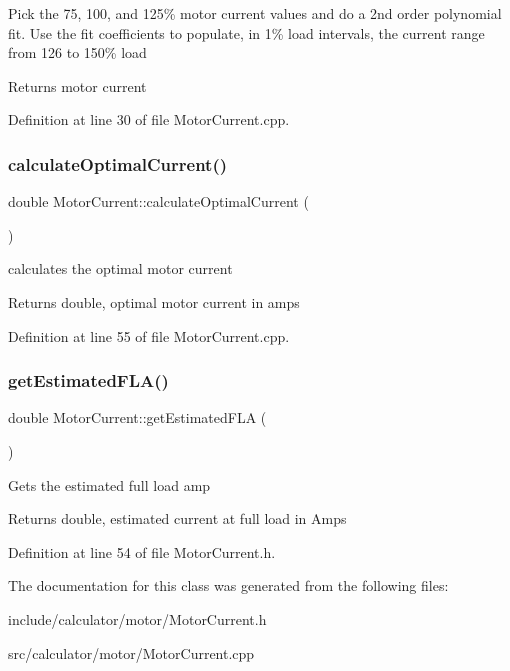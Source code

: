 Pick the 75, 100, and 125\% motor current values and do a 2nd order polynomial fit. Use the fit coefficients to populate, in 1\% load intervals, the current range from 126 to 150\% load \begin{DoxyReturn}{Returns}
motor current 
\end{DoxyReturn}


Definition at line 30 of file Motor\+Current.\+cpp.

\mbox{\label{class_motor_current_a40638a00e4d21b34c74f8406f4e70046}} 
\subsubsection{\texorpdfstring{calculate\+Optimal\+Current()}{calculateOptimalCurrent()}}
{\footnotesize\ttfamily double Motor\+Current\+::calculate\+Optimal\+Current (\begin{DoxyParamCaption}{ }\end{DoxyParamCaption})}

calculates the optimal motor current \begin{DoxyReturn}{Returns}
double, optimal motor current in amps 
\end{DoxyReturn}


Definition at line 55 of file Motor\+Current.\+cpp.

\mbox{\label{class_motor_current_a0f845ec03585b21a8e476ed3e63f365f}} 
\subsubsection{\texorpdfstring{get\+Estimated\+F\+L\+A()}{getEstimatedFLA()}}
{\footnotesize\ttfamily double Motor\+Current\+::get\+Estimated\+F\+LA (\begin{DoxyParamCaption}{ }\end{DoxyParamCaption})\hspace{0.3cm}{\ttfamily [inline]}}

Gets the estimated full load amp \begin{DoxyReturn}{Returns}
double, estimated current at full load in Amps 
\end{DoxyReturn}


Definition at line 54 of file Motor\+Current.\+h.



The documentation for this class was generated from the following files\+:\begin{DoxyCompactItemize}
\item 
include/calculator/motor/Motor\+Current.\+h\item 
src/calculator/motor/Motor\+Current.\+cpp\end{DoxyCompactItemize}
